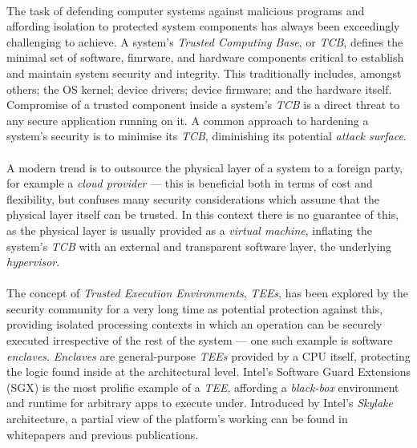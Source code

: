 


\paragraph{} The task of defending computer systems against malicious programs and affording isolation to protected system components has always been exceedingly challenging to achieve. A system's \textit{Trusted Computing Base}, or \textit{TCB}, defines the minimal set of software, fimrware, and hardware components critical to establish and maintain system security and integrity. This traditionally includes, amongst others; the OS kernel; device drivers; device firmware; and the hardware itself. Compromise of a trusted component inside a system's \textit{TCB} is a direct threat to any secure application running on it. A common approach to hardening a system's security is to minimise its \textit{TCB}, diminishing its potential \textit{attack surface}. 

\paragraph{} A modern trend is to outsource the physical layer of a system to a foreign party, for example a \textit{cloud provider} --- this is beneficial both in terms of cost and flexibility, but confuses many security considerations which assume that the physical layer itself can be trusted. In this context there is no guarantee of this, as the physical layer is usually provided as a \textit{virtual machine}, inflating the system's \textit{TCB} with an external and transparent software layer, the underlying \textit{hypervisor}.

\paragraph{} The concept of \textit{Trusted Execution Environments}, \textit{TEEs}, has been explored by the security community for a very long time as potential protection against this, providing isolated processing contexts in which an operation can be securely executed irrespective of the rest of the system --- one such example is software \textit{enclaves}. \textit{Enclaves} are general-purpose \textit{TEEs} provided by a CPU itself, protecting the logic found inside at the architectural level. Intel's Software Guard Extensions (SGX) is the most prolific example of a \textit{TEE}, affording a \textit{black-box} environment and runtime for arbitrary apps to execute under. Introduced by Intel's \textit{Skylake} architecture, a partial view of the platform's working can be found in whitepapers and previous publications.

